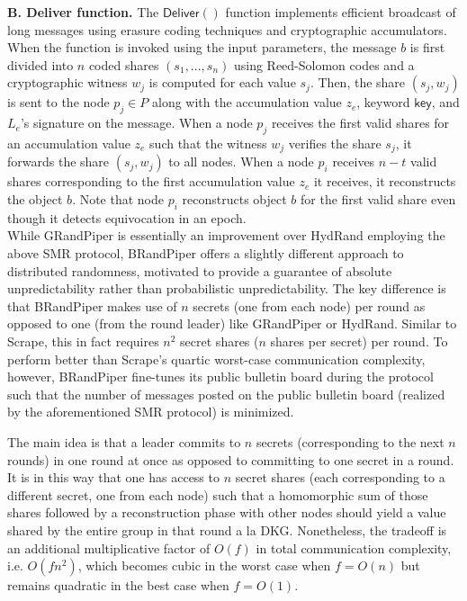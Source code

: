 \documentclass[11pt]{article}
\theoremstyle{definition}
\theoremstyle{remark}
\begin{document}
\textbf{B. Deliver function.} The $\mathsf{Deliver}()$ function implements efficient broadcast of long messages using erasure coding techniques and cryptographic accumulators. When the function is invoked using the input parameters, the message $b$ is first divided into $n$ coded shares $(s_1, ..., s_n)$ using Reed-Solomon codes and a cryptographic witness $w_j$ is computed for each value $s_j$. Then, the share $(s_j, w_j)$ is sent to the node $p_j \in P$ along with the accumulation value $z_e$, keyword $\mathsf{key}$, and $L_e$'s signature on the message. When a node $p_j$ receives the first valid shares for an accumulation value $z_e$ such that the witness $w_j$ verifies the share $s_j$, it forwards the share $(s_j, w_j)$ to all nodes. When a node $p_i$ receives $n - t$ valid shares corresponding to the first accumulation value $z_e$ it receives, it reconstructs the object $b$. Note that node $p_i$ reconstructs object $b$ for the first valid share even though it detects equivocation in an epoch.\\

While GRandPiper is essentially an improvement over HydRand employing the above SMR protocol, BRandPiper offers a slightly different approach to distributed randomness, motivated to provide a guarantee of absolute unpredictability rather than probabilistic unpredictability. The key difference is that BRandPiper makes use of $n$ secrets (one from each node) per round as opposed to one (from the round leader) like GRandPiper or HydRand. Similar to Scrape, this in fact requires $n^2$ secret shares ($n$ shares per secret) per round. To perform better than Scrape's quartic worst-case communication complexity, however, BRandPiper fine-tunes its public bulletin board during the protocol such that the number of messages posted on the public bulletin board (realized by the aforementioned SMR protocol) is minimized.

The main idea is that a leader commits to $n$ secrets (corresponding to the next $n$ rounds) in one round at once as opposed to committing to one secret in a round. It is in this way that one has access to $n$ secret shares (each corresponding to a different secret, one from each node) such that a homomorphic sum of those shares followed by a reconstruction phase with other nodes should yield a value shared by the entire group in that round a la DKG. Nonetheless, the tradeoff is an additional multiplicative factor of $O(f)$ in total communication complexity, i.e. $O(f n^2)$, which becomes cubic in the worst case when $f = O(n)$ but remains quadratic in the best case when $f = O(1)$.
\end{document}
